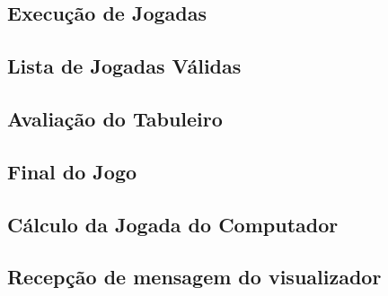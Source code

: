 \documentclass[15pt,a4paper]{article}
\begin{document}
\subsection{Execução de Jogadas}




\subsection{Lista de Jogadas Válidas}




\subsection{Avaliação do Tabuleiro}




\subsection{Final do Jogo}




\subsection{Cálculo da Jogada do Computador}




\subsection{Recepção de mensagem do visualizador}
\end{document}
